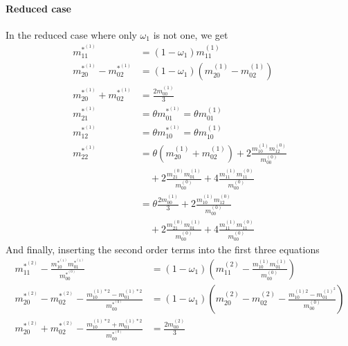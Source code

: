 \paragraph{Reduced case}
\label{par:Reduced case}
In the reduced case where only $\omega_1$ is not one, we get
\begin{equation}
  \begin{aligned}
    m_{11}^{*^{(1)}} & = (1-\omega_1) m_{11}^{(1)} \\
    m_{20}^{*^{(1)}} - m_{02}^{*^{(1)}}
      & = (1-\omega_1) (m_{20}^{(1)} - m_{02}^{(1)}) \\
    m_{20}^{*^{(1)}} + m_{02}^{*^{(1)}}
      & =  \frac{2 m_{00}^{(1)}}{3} \\
    m_{21}^{*^{(1)}} & = \theta m_{01}^{*^{(1)}} = \theta m_{01}^{(1)} \\
    m_{12}^{*^{(1)}} & = \theta m_{10}^{*^{(1)}} = \theta m_{10}^{(1)} \\
    m_{22}^{*^{(1)}} & =  \theta (m_{20}^{(1)} + m_{02}^{(1)})
      + 2\frac{ m_{10}^{(1)} m_{12}^{(0)} }{m_{00}^{(0)}}
      \\&\quad
      + 2\frac{ m_{21}^{(0)} m_{01}^{(1)} }{m_{00}^{(0)}}
      + 4\frac{ m_{11}^{(1)} m_{11}^{(0)} }{m_{00}^{(0)}}
      \\&= \theta \frac{2 m_{00}^{(1)}}{3} + 2\frac{ m_{10}^{(1)} m_{12}^{(0)} }{m_{00}^{(0)}}
      \\&\quad
      + 2\frac{ m_{21}^{(0)} m_{01}^{(1)} }{m_{00}^{(0)}}
      + 4\frac{ m_{11}^{(1)} m_{11}^{(0)} }{m_{00}^{(0)}}
  \end{aligned}
\end{equation}
And finally, inserting the second order terms into the first three equations
\begin{equation}
  \begin{aligned}
    m_{11}^{*^{(2)}} - \frac{ m_{10}^{*^{(1)}}m_{01}^{*^{(1)}}}{m_{00}^{*^{(0)}}} & = (1-\omega_1)\left(m_{11}^{(2)} - \frac{ m_{10}^{(1)}m_{01}^{(1)}}{m_{00}^{(0)}}\right) \\
    m_{20}^{*^{(2)}}-m_{02}^{*^{(2)}} - \frac{ m_{10}^{(1)*2} - m_{01}^{(1)*2}}{m_{00}^{*^{(0)}}} & = (1-\omega_1) \left(m_{20}^{(2)}-m_{02}^{(2)} - \frac{ m_{10}^{(1)2} - m_{01}^{{(1)}^2}}{m_{00}^{(0)}}\right) \\
    m_{20}^{*^{(2)}}+m_{02}^{*^{(2)}} - \frac{ m_{10}^{(1)*2} + m_{01}^{(1)*2}}{m_{00}^{*^{(0)}}} & = \frac{2 m_{00}^{(2)}}{3}
  \end{aligned}
\end{equation}

